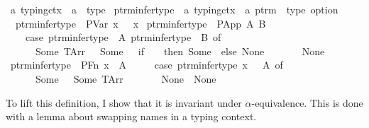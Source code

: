 \begin{implementation}
\isamarkupfalse%
\ {\isacharprime}a\ typing{\isacharunderscore}ctx\ {\isacharequal}\ {\isachardoublequoteopen}{\isacharprime}a\ {\isasymrightharpoonup}\ type{\isachardoublequoteclose}\isanewline
\isanewline
{}\isamarkupfalse%
\ ptrm{\isacharunderscore}infer{\isacharunderscore}type\ {\isacharcolon}{\isacharcolon}\ {\isachardoublequoteopen}{\isacharprime}a\ typing{\isacharunderscore}ctx\ {\isasymRightarrow}\ {\isacharprime}a\ ptrm\ {\isasymRightarrow}\ type\ option{\isachardoublequoteclose}\ \isanewline
\ \ {\isachardoublequoteopen}ptrm{\isacharunderscore}infer{\isacharunderscore}type\ {\isasymGamma}\ {\isacharparenleft}PVar\ x{\isacharparenright}\ {\isacharequal}\ {\isasymGamma}\ x{\isachardoublequoteclose}\isanewline
{\isacharbar}\ {\isachardoublequoteopen}ptrm{\isacharunderscore}infer{\isacharunderscore}type\ {\isasymGamma}\ {\isacharparenleft}PApp\ A\ B{\isacharparenright}\ {\isacharequal}\isanewline
\ \ \ \ {\isacharparenleft}case\ {\isacharparenleft}ptrm{\isacharunderscore}infer{\isacharunderscore}type\ {\isasymGamma}\ A{\isacharcomma}\ ptrm{\isacharunderscore}infer{\isacharunderscore}type\ {\isasymGamma}\ B{\isacharparenright}\ of\isanewline
\ \ \ \ \ \ {\isacharparenleft}Some\ {\isacharparenleft}TArr\ {\isasymtau}\ {\isasymsigma}{\isacharparenright}{\isacharcomma}\ Some\ {\isasymtau}{\isacharprime}{\isacharparenright}\ {\isasymRightarrow}\ {\isacharparenleft}if\ {\isasymtau}\ {\isacharequal}\ {\isasymtau}{\isacharprime}\ then\ Some\ {\isasymsigma}\ else\ None{\isacharparenright}\isanewline
\ \ \ \ {\isacharbar}\ {\isacharunderscore}\ {\isasymRightarrow}\ None{\isacharparenright}{\isachardoublequoteclose}\isanewline
{\isacharbar}\ {\isachardoublequoteopen}ptrm{\isacharunderscore}infer{\isacharunderscore}type\ {\isasymGamma}\ {\isacharparenleft}PFn\ x\ {\isasymtau}\ A{\isacharparenright}\ {\isacharequal}\isanewline
\ \ \ \ {\isacharparenleft}case\ ptrm{\isacharunderscore}infer{\isacharunderscore}type\ {\isacharparenleft}{\isasymGamma}{\isacharparenleft}x\ {\isasymmapsto}\ {\isasymtau}{\isacharparenright}{\isacharparenright}\ A\ of\isanewline
\ \ \ \ \ \ Some\ {\isasymsigma}\ {\isasymRightarrow}\ Some\ {\isacharparenleft}TArr\ {\isasymtau}\ {\isasymsigma}{\isacharparenright}\isanewline
\ \ \ \ {\isacharbar}\ None\ {\isasymRightarrow}\ None{\isacharparenright}{\isachardoublequoteclose}
\end{implementation}

To lift this definition, I show that it is invariant under \(\alpha\)-equivalence.
This is done with a lemma about swapping names in a typing context.

